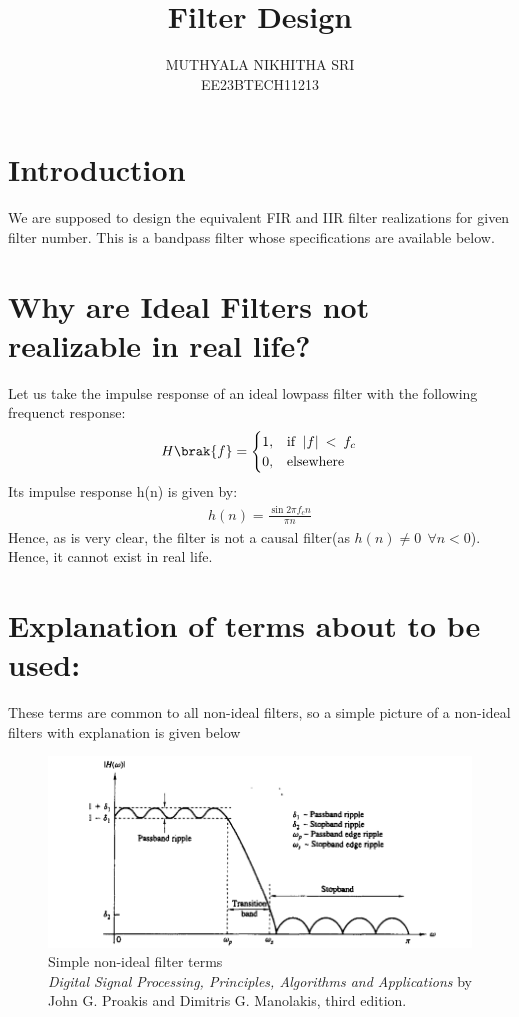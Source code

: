 \documentclass{article}
\begin{document}
\title{ \textbf{Filter Design}}

\author{MUTHYALA NIKHITHA SRI\\EE23BTECH11213}
\date{}

\maketitle
\section{Introduction}
We are supposed to design the equivalent FIR and IIR filter realizations for given filter number.  
This is a bandpass filter whose specifications are available below.
\section{Why are Ideal Filters not realizable in real life?}
Let us take the impulse response of an ideal lowpass filter with the following frequenct response:
\begin{align}
H\brak{f}=
    \begin{cases}
        1, & \text{if }\:|f|\:<\:f_c\\
        0, & \text{elsewhere}
    \end{cases} 
\end{align}
Its impulse response h(n) is given by:
\begin{align}
    h(n) = \frac{\sin{2 \pi f_c n}}{\pi n}
\end{align}
Hence, as is very clear, the filter is not a causal filter(as $h(n) \neq 0 \:\:\forall n<0$). Hence, it cannot exist in real life.
\section{Explanation of terms about to be used:}
These terms are common to all non-ideal filters, so a simple picture of a non-ideal filters with explanation is given below
\begin{figure}[H]
\centering
\includegraphics[width=1\columnwidth]{figs/Non-Ideal-Filter.png}
\caption{Simple non-ideal filter terms\\ \textit{Digital Signal Processing, Principles, Algorithms and Applications} by John G. Proakis and Dimitris G. Manolakis, third edition.}
\label{fig:Non_ideal_filter_terms}
\end{figure}
\end{document}
